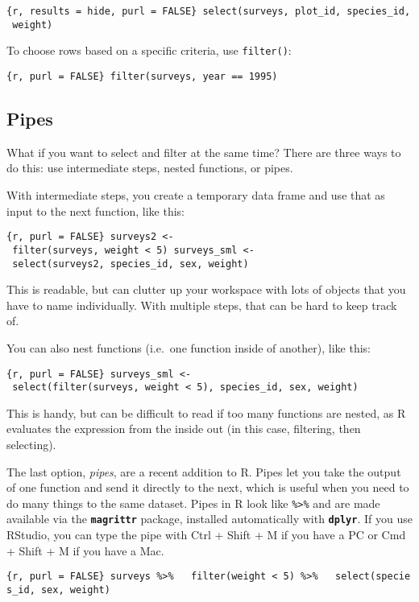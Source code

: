 \documentclass[]{article}
\begin{document}
\texttt{\{r,\ results\ =\ \textquotesingle{}hide\textquotesingle{},\ purl\ =\ FALSE\}\ select(surveys,\ plot\_id,\ species\_id,\ weight)}

To choose rows based on a specific criteria, use \texttt{filter()}:

\texttt{\{r,\ purl\ =\ FALSE\}\ filter(surveys,\ year\ ==\ 1995)}

\subsection{Pipes}\label{pipes}

What if you want to select and filter at the same time? There are three
ways to do this: use intermediate steps, nested functions, or pipes.

With intermediate steps, you create a temporary data frame and use that
as input to the next function, like this:

\texttt{\{r,\ purl\ =\ FALSE\}\ surveys2\ \textless{}-\ filter(surveys,\ weight\ \textless{}\ 5)\ surveys\_sml\ \textless{}-\ select(surveys2,\ species\_id,\ sex,\ weight)}

This is readable, but can clutter up your workspace with lots of objects
that you have to name individually. With multiple steps, that can be
hard to keep track of.

You can also nest functions (i.e.~one function inside of another), like
this:

\texttt{\{r,\ purl\ =\ FALSE\}\ surveys\_sml\ \textless{}-\ select(filter(surveys,\ weight\ \textless{}\ 5),\ species\_id,\ sex,\ weight)}

This is handy, but can be difficult to read if too many functions are
nested, as R evaluates the expression from the inside out (in this case,
filtering, then selecting).

The last option, \emph{pipes}, are a recent addition to R. Pipes let you
take the output of one function and send it directly to the next, which
is useful when you need to do many things to the same dataset. Pipes in
R look like \texttt{\%\textgreater{}\%} and are made available via the
\textbf{\texttt{magrittr}} package, installed automatically with
\textbf{\texttt{dplyr}}. If you use RStudio, you can type the pipe with
Ctrl + Shift + M if you have a PC or Cmd + Shift + M if you have a Mac.

\texttt{\{r,\ purl\ =\ FALSE\}\ surveys\ \%\textgreater{}\%\ \ \ filter(weight\ \textless{}\ 5)\ \%\textgreater{}\%\ \ \ select(species\_id,\ sex,\ weight)}
\end{document}
